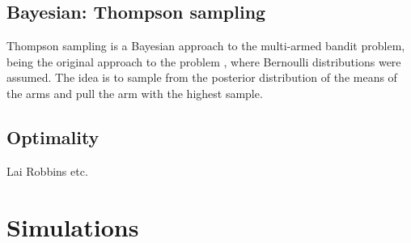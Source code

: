 \subsection{Bayesian: Thompson sampling}
Thompson sampling is a Bayesian approach to the multi-armed bandit problem, being the original approach to the problem \cite{thompson1933}, where Bernoulli distributions were assumed.
The idea is to sample from the posterior distribution of the means of the arms and pull the arm with the highest sample.


\subsection{Optimality}
Lai Robbins etc.

\section{Simulations}